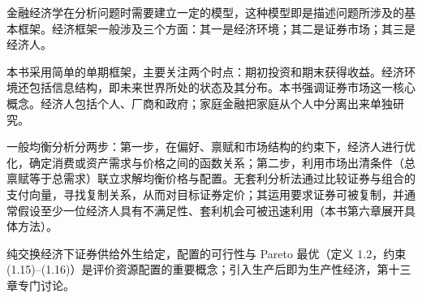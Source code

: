 

\begin{tcolorbox}[summary,title=本章小结]
金融经济学在分析问题时需要建立一定的模型，这种模型即是描述问题所涉及的基本框架。经济框架一般涉及三个方面：其一是经济环境；其二是证券市场；其三是经济人。

本书采用简单的单期框架，主要关注两个时点：期初投资和期末获得收益。经济环境还包括信息结构，即未来世界所处的状态及其分布。本书强调证券市场这一核心概念。经济人包括个人、厂商和政府；家庭金融把家庭从个人中分离出来单独研究。

一般均衡分析分两步：第一步，在偏好、禀赋和市场结构的约束下，经济人进行优化，确定消费或资产需求与价格之间的函数关系；第二步，利用市场出清条件（总禀赋等于总需求）联立求解均衡价格与配置。无套利分析法通过比较证券与组合的支付向量，寻找复制关系，从而对目标证券定价；其运用要求证券可被复制，并通常假设至少一位经济人具有不满足性、套利机会可被迅速利用（本书第六章展开具体方法）。

纯交换经济下证券供给外生给定，配置的可行性与 Pareto 最优（定义 1.2，约束 (1.15)--(1.16)）是评价资源配置的重要概念；引入生产后即为生产性经济，第十三章专门讨论。
\end{tcolorbox}



